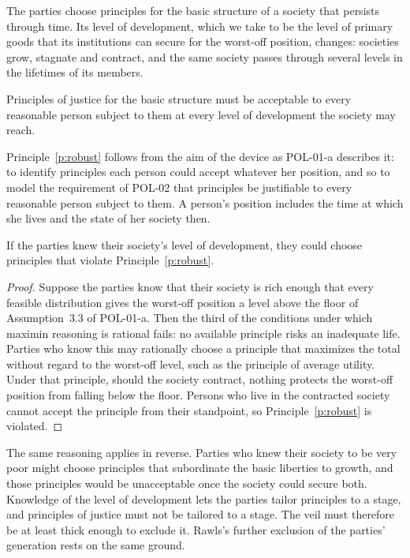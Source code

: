 \documentclass{situationist-preprint}
\begin{document}
The parties choose principles for the basic structure of a society that persists through time. Its level of development, which we take to be the level of primary goods that its institutions can secure for the worst-off position, changes: societies grow, stagnate and contract, and the same society passes through several levels in the lifetimes of its members.

\begin{principle}[Robustness]\label{p:robust}
Principles of justice for the basic structure must be acceptable to every reasonable person subject to them at every level of development the society may reach.
\end{principle}

Principle~\ref{p:robust} follows from the aim of the device as POL-01-a describes it: to identify principles each person could accept whatever her position, and so to model the requirement of POL-02 that principles be justifiable to every reasonable person subject to them. A person's position includes the time at which she lives and the state of her society then.

\begin{proposition}\label{p:level}
If the parties knew their society's level of development, they could choose principles that violate Principle~\ref{p:robust}.
\end{proposition}

\begin{proof}
Suppose the parties know that their society is rich enough that every feasible distribution gives the worst-off position a level above the floor of Assumption~3.3 of POL-01-a. Then the third of the conditions under which maximin reasoning is rational fails: no available principle risks an inadequate life. Parties who know this may rationally choose a principle that maximizes the total without regard to the worst-off level, such as the principle of average utility. Under that principle, should the society contract, nothing protects the worst-off position from falling below the floor. Persons who live in the contracted society cannot accept the principle from their standpoint, so Principle~\ref{p:robust} is violated.
\end{proof}

The same reasoning applies in reverse. Parties who knew their society to be very poor might choose principles that subordinate the basic liberties to growth, and those principles would be unacceptable once the society could secure both. Knowledge of the level of development lets the parties tailor principles to a stage, and principles of justice must not be tailored to a stage. The veil must therefore be at least thick enough to exclude it. Rawls's further exclusion of the parties' generation \citep[\S 24]{Rawls1971} rests on the same ground.
\end{document}
